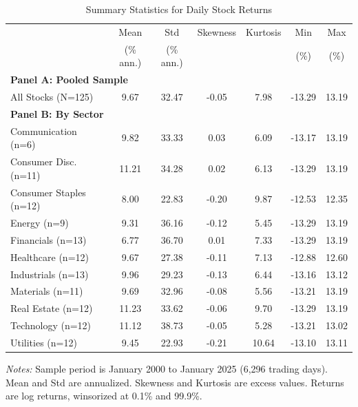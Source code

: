 
\begin{table}[htbp]
\centering
\caption{Summary Statistics for Daily Stock Returns}
\label{tab:summary_stats}
\small
\begin{tabular}{lcccccc}
\toprule
 & Mean & Std & Skewness & Kurtosis & Min & Max \\
 & (\% ann.) & (\% ann.) & & & (\%) & (\%) \\
\midrule
\multicolumn{7}{l}{\textbf{Panel A: Pooled Sample}} \\
All Stocks (N=125) & 9.67 & 32.47 & -0.05 & 7.98 & -13.29 & 13.19 \\
\midrule
\multicolumn{7}{l}{\textbf{Panel B: By Sector}} \\
Communication (n=6) & 9.82 & 33.33 & 0.03 & 6.09 & -13.17 & 13.19 \\
Consumer Disc. (n=11) & 11.21 & 34.28 & 0.02 & 6.13 & -13.29 & 13.19 \\
Consumer Staples (n=12) & 8.00 & 22.83 & -0.20 & 9.87 & -12.53 & 12.35 \\
Energy (n=9) & 9.31 & 36.16 & -0.12 & 5.45 & -13.29 & 13.19 \\
Financials (n=13) & 6.77 & 36.70 & 0.01 & 7.33 & -13.29 & 13.19 \\
Healthcare (n=12) & 9.67 & 27.38 & -0.11 & 7.13 & -12.88 & 12.60 \\
Industrials (n=13) & 9.96 & 29.23 & -0.13 & 6.44 & -13.16 & 13.12 \\
Materials (n=11) & 9.69 & 32.96 & -0.08 & 5.56 & -13.21 & 13.19 \\
Real Estate (n=12) & 11.23 & 33.62 & -0.06 & 9.70 & -13.29 & 13.19 \\
Technology (n=12) & 11.12 & 38.73 & -0.05 & 5.28 & -13.21 & 13.02 \\
Utilities (n=12) & 9.45 & 22.93 & -0.21 & 10.64 & -13.10 & 13.11 \\
\bottomrule
\end{tabular}
\begin{tablenotes}\small
\item \textit{Notes:} Sample period is January 2000 to January 2025 (6,296 trading days). Mean and Std are annualized. Skewness and Kurtosis are excess values. Returns are log returns, winsorized at 0.1\% and 99.9\%.
\end{tablenotes}
\end{table}


